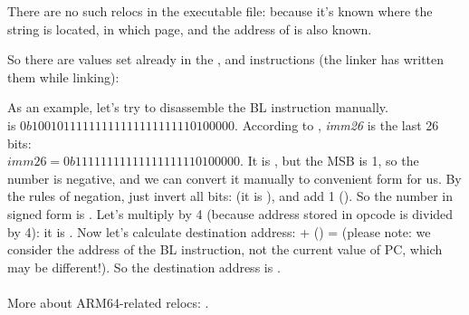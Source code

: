 There are no such relocs in the executable file: because it's known where the  string
is located, in which page, and the address of \puts is also known.

So there are values set already in the , \ADD and  instructions
(the linker has written them while linking):




As an example, let's try to disassemble the BL instruction manually.\\
 is $0b10010111111111111111111110100000$.
According to , \emph{imm26} is the last 26 bits:\\
$imm26 = 0b11111111111111111110100000$.
It is , but the \ac{MSB} is 1, 
so the number is negative, and we can convert it manually to convenient form for us.
By the rules of negation, just invert all bits: (it is ), and add 1 ().
So the number in signed form is .
Let's multiply  by 4 (because address stored in opcode is divided by 4): it is .
Now let's calculate destination address:  + () =  
(please note: we consider the address of the BL instruction, not the current value of \ac{PC}, which may be different!).
So the destination address is .\\
\\
More about ARM64-related relocs: \ARMELF.
